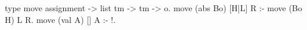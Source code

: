   type move assignment -> list tm -> tm -> o.
  move (abs Bo) [H|L] R :- move (Bo H) L R.
  move (val A)  [] A :- !.

